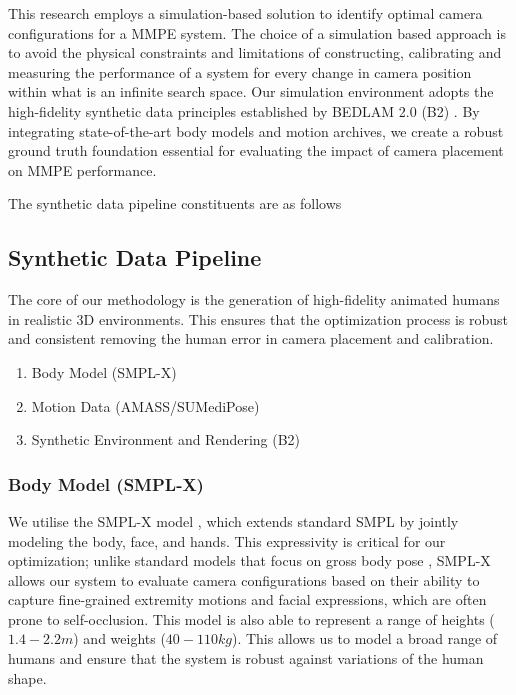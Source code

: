 \renewcommand{\labelenumii}{\arabic{enumi}.\arabic{enumii}}
\renewcommand{\labelenumiii}{\arabic{enumi}.\arabic{enumii}.\arabic{enumiii}}
\renewcommand{\labelenumiv}{\arabic{enumi}.\arabic{enumii}.\arabic{enumiii}.\arabic{enumiv}}

\label{chap:methodologyandproposedresearchplan}

\label{sec:methodology}

 This research employs a simulation-based solution to identify optimal camera configurations for a MMPE system.
The choice of a simulation based approach is to avoid the physical constraints and limitations of constructing, calibrating and measuring the performance of a system for every change in camera position within what is an infinite search space. Our simulation environment adopts the high-fidelity synthetic data principles established by BEDLAM 2.0 (B2) \cite{tesch2025bedlam2}. By  integrating state-of-the-art body models and motion archives, we create a robust ground truth foundation essential for evaluating the impact of camera placement on MMPE performance.

The synthetic data pipeline constituents are as follows

\subsection{Synthetic Data Pipeline}
\label{sec:syntheticdatapipeline}

The core of our methodology is the generation of high-fidelity animated humans in realistic 3D environments. This ensures that the optimization process is robust and consistent removing the human error in camera placement and calibration.

\begin{enumerate}
    \item Body Model (SMPL-X)
    \item Motion Data (AMASS/SUMediPose)
    \item Synthetic Environment and Rendering (B2)
\end{enumerate}

\subsubsection{Body Model (SMPL-X)}

We utilise the SMPL-X model \cite{pavlakos2019expressive}, which extends standard SMPL by jointly modeling the body, face, and hands. This expressivity is critical for our optimization; unlike standard models that focus on gross body pose , SMPL-X allows our system to evaluate camera configurations based on their ability to capture fine-grained extremity motions and facial expressions, which are often prone to self-occlusion. This model is also able to represent a range of heights ($1.4-2.2 m$) and weights ($40-110 kg$). This allows us to model a broad range of humans and ensure that the system is robust against variations of the human shape.

